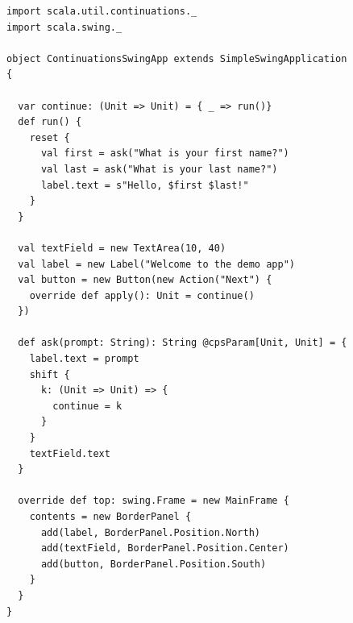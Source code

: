 \begin{figure}

    \begin{minipage}{.7\linewidth}
      \centering
        \begin{lstlisting}
import scala.util.continuations._
import scala.swing._

object ContinuationsSwingApp extends SimpleSwingApplication {

  var continue: (Unit => Unit) = { _ => run()}
  def run() {
    reset {
      val first = ask("What is your first name?")
      val last = ask("What is your last name?")
      label.text = s"Hello, $first $last!"
    }
  }

  val textField = new TextArea(10, 40)
  val label = new Label("Welcome to the demo app")
  val button = new Button(new Action("Next") {
    override def apply(): Unit = continue()
  })

  def ask(prompt: String): String @cpsParam[Unit, Unit] = {
    label.text = prompt
    shift {
      k: (Unit => Unit) => {
        continue = k
      }
    }
    textField.text
  }

  override def top: swing.Frame = new MainFrame {
    contents = new BorderPanel {
      add(label, BorderPanel.Position.North)
      add(textField, BorderPanel.Position.Center)
      add(button, BorderPanel.Position.South)
    }
  }
}
\end{lstlisting}
    \end{minipage}%
    \begin{minipage}{.3\linewidth}
      \centering


\end{minipage}
\end{figure}

